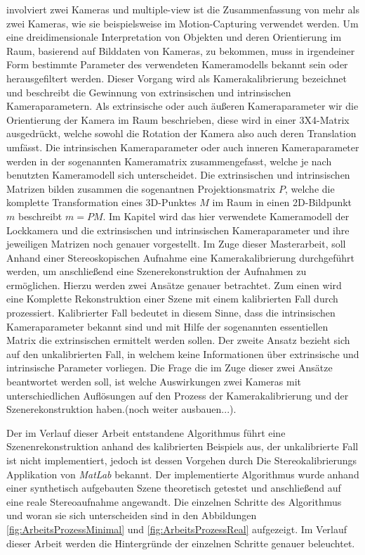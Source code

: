 involviert zwei Kameras und multiple-view ist die Zusammenfassung von mehr als zwei Kameras, wie sie beispielsweise im Motion-Capturing verwendet werden\cite{HZ}. Um eine dreidimensionale Interpretation von Objekten und deren Orientierung im Raum, basierend auf Bilddaten von Kameras, zu bekommen, muss in irgendeiner Form bestimmte Parameter des verwendeten Kameramodells bekannt sein oder herausgefiltert werden. Dieser Vorgang wird als Kamerakalibrierung bezeichnet und beschreibt die Gewinnung von extrinsischen und intrinsischen Kameraparametern\cite{HZ,Ferid,Elements,ZZGXr}. Als extrinsische oder auch äußeren Kameraparameter wir die Orientierung der Kamera im Raum beschrieben, diese wird in einer 3X4-Matrix ausgedrückt, welche sowohl die Rotation der Kamera also auch deren Translation umfässt. Die intrinsischen Kameraparameter oder auch inneren Kameraparameter werden in der sogenannten Kameramatrix zusammengefasst, welche je nach benutzten Kameramodell sich unterscheidet. Die extrinsischen  und intrinsischen Matrizen bilden zusammen die sogenantnen Projektionsmatrix $P$, welche die komplette Transformation eines 3D-Punktes $M$ im Raum in einen 2D-Bildpunkt $m$ beschreibt $m = PM$. Im Kapitel  wird das hier verwendete Kameramodell der Lockkamera und die extrinsischen und intrinsischen Kameraparameter und ihre jeweiligen Matrizen noch genauer vorgestellt. Im Zuge dieser Masterarbeit, soll Anhand einer Stereoskopischen Aufnahme eine Kamerakalibrierung durchgeführt werden, um anschließend eine Szenerekonstruktion der Aufnahmen zu ermöglichen. Hierzu werden zwei Ansätze genauer betrachtet. Zum einen wird eine Komplette Rekonstruktion einer Szene mit einem kalibrierten Fall durch prozessiert. Kalibrierter Fall bedeutet in diesem Sinne, dass die intrinsischen Kameraparameter bekannt sind und mit Hilfe der sogenannten essentiellen Matrix die extrinsischen ermittelt werden sollen. Der zweite Ansatz bezieht sich auf den unkalibrierten Fall, in welchem keine Informationen über extrinsische und intrinsische Parameter vorliegen. Die Frage die im Zuge dieser zwei Ansätze beantwortet werden soll, ist welche Auswirkungen zwei Kameras mit unterschiedlichen Auflösungen auf den Prozess der Kamerakalibrierung und der Szenerekonstruktion haben.(noch weiter ausbauen...).

Der im Verlauf dieser Arbeit entstandene Algorithmus führt eine Szenenrekonstruktion anhand des kalibrierten Beispiels aus, der unkalibrierte Fall ist nicht implementiert, jedoch ist dessen Vorgehen durch Die Stereokalibrierungs Applikation von \textit{MatLab}\cite{MatlabStereoApp} bekannt. Der implementierte Algorithmus wurde anhand einer synthetisch aufgebauten Szene theoretisch getestet und anschließend auf eine reale Stereoaufnahme angewandt. Die einzelnen Schritte des Algorithmus und woran sie sich unterscheiden sind in den Abbildungen \ref{fig:ArbeitsProzessMinimal} und \ref{fig:ArbeitsProzessReal} aufgezeigt. Im Verlauf dieser Arbeit werden die Hintergründe der einzelnen Schritte genauer beleuchtet.


